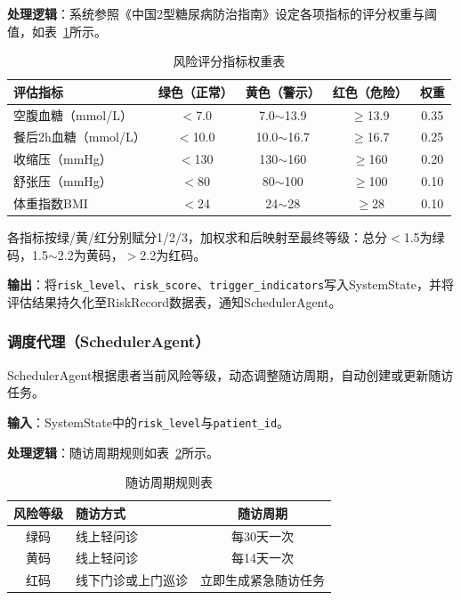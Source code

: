 \textbf{处理逻辑}：系统参照《中国2型糖尿病防治指南》设定各项指标的评分权重与阈值，如表~\ref{tab:risk-weights}所示。

\begin{table}[H]
\centering
\caption{风险评分指标权重表}
\label{tab:risk-weights}
\begin{tabularx}{\textwidth}{|l|c|c|c|c|}
\hline
\textbf{评估指标} & \textbf{绿色（正常）} & \textbf{黄色（警示）} & \textbf{红色（危险）} & \textbf{权重} \\
\hline
空腹血糖（mmol/L） & $<$7.0 & 7.0$\sim$13.9 & $\geq$13.9 & 0.35 \\
\hline
餐后2h血糖（mmol/L） & $<$10.0 & 10.0$\sim$16.7 & $\geq$16.7 & 0.25 \\
\hline
收缩压（mmHg） & $<$130 & 130$\sim$160 & $\geq$160 & 0.20 \\
\hline
舒张压（mmHg） & $<$80 & 80$\sim$100 & $\geq$100 & 0.10 \\
\hline
体重指数BMI & $<$24 & 24$\sim$28 & $\geq$28 & 0.10 \\
\hline
\end{tabularx}
\end{table}

各指标按绿/黄/红分别赋分1/2/3，加权求和后映射至最终等级：总分$<$1.5为绿码，1.5$\sim$2.2为黄码，$>$2.2为红码。

\textbf{输出}：将\texttt{risk\_level}、\texttt{risk\_score}、\texttt{trigger\_indicators}写入SystemState，并将评估结果持久化至RiskRecord数据表，通知SchedulerAgent。


\subsubsection{调度代理（SchedulerAgent）}

SchedulerAgent根据患者当前风险等级，动态调整随访周期，自动创建或更新随访任务。

\textbf{输入}：SystemState中的\texttt{risk\_level}与\texttt{patient\_id}。

\textbf{处理逻辑}：随访周期规则如表~\ref{tab:visit-schedule}所示。

\begin{table}[H]
\centering
\caption{随访周期规则表}
\label{tab:visit-schedule}
\begin{tabularx}{\textwidth}{|c|X|c|}
\hline
\textbf{风险等级} & \textbf{随访方式} & \textbf{随访周期} \\
\hline
绿码 & 线上轻问诊 & 每30天一次 \\
\hline
黄码 & 线上轻问诊 & 每14天一次 \\
\hline
红码 & 线下门诊或上门巡诊 & 立即生成紧急随访任务 \\
\hline
\end{tabularx}
\end{table}

